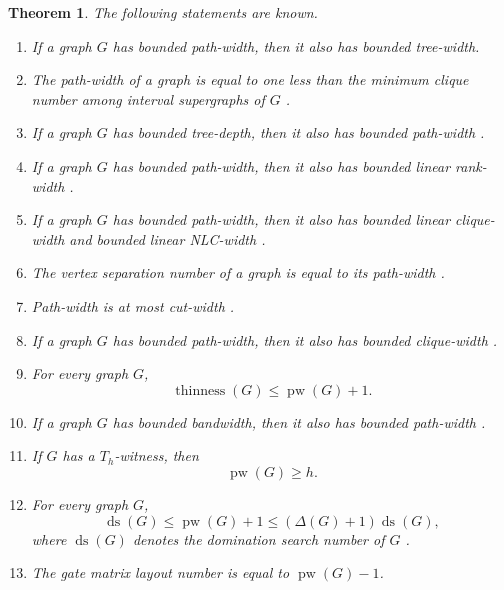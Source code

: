 \documentclass[10pt]{book}
\newtheorem{theorem}{Theorem}[section]
\theoremstyle{definition}
\DeclareMathOperator{\pw}{pw}
\DeclareMathOperator{\thinness}{thinness}
\begin{document}
\begin{theorem}
The following statements are known.
\begin{enumerate}
    \item If a graph \(G\) has bounded path-width, then it also has bounded tree-width.

    \item The path-width of a graph is equal to one less than the minimum clique number among interval supergraphs of \(G\) \cite{213}.

    \item If a graph \(G\) has bounded tree-depth, then it also has bounded path-width \cite{311}.

    \item If a graph \(G\) has bounded path-width, then it also has bounded linear rank-width \cite{323}.

    \item If a graph \(G\) has bounded path-width, then it also has bounded linear clique-width and bounded linear NLC-width \cite{39}.

    \item The vertex separation number of a graph is equal to its path-width \cite{320}.

    \item Path-width is at most cut-width \cite{321}.

    \item If a graph \(G\) has bounded path-width, then it also has bounded clique-width \cite{325}.

    \item For every graph \(G\),
    \[
    \thinness(G)\leq \pw(G)+1.
    \]
    \cite{mannino2007stable}

    \item If a graph \(G\) has bounded bandwidth, then it also has bounded path-width \cite{313}.

    \item If \(G\) has a \(T_h\)-witness, then
    \[
    \pw(G)\geq h.
    \]
        \cite{groenland2023approximating}

    \item For every graph \(G\),
    \[
    \operatorname{ds}(G)\leq \pw(G)+1 \leq (\Delta(G)+1)\operatorname{ds}(G),
    \]
    where \(\operatorname{ds}(G)\) denotes the domination search number of \(G\)    \cite{kreutzer2016complexity}.

    \item The gate matrix layout number is equal to \(\pw(G)-1\).
\end{enumerate}
\end{theorem}
\end{document}
